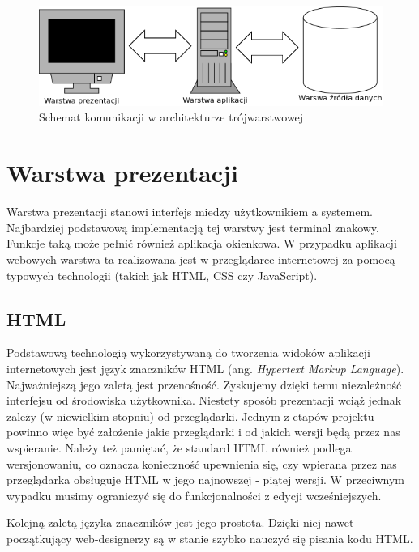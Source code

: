 \begin{figure}[tdh]
    \begin{center}
	\includegraphics[scale=.7 ]{img/warstwy.png}
	\caption{Schemat komunikacji w architekturze trójwarstwowej}
	\label{warstwy}
    \end{center}
\end{figure}


\section[Warstwa prezentacji][Warstwa prezentacji]{Warstwa prezentacji}
Warstwa prezentacji stanowi interfejs miedzy użytkownikiem a systemem. Najbardziej podstawową implementacją tej warstwy jest terminal znakowy. Funkcje taką może pełnić również aplikacja okienkowa. W przypadku aplikacji webowych warstwa ta realizowana jest w przeglądarce internetowej za pomocą typowych technologii (takich jak HTML, CSS czy JavaScript).

\subsection[HTML][HTML]{HTML}
Podstawową technologią wykorzystywaną do tworzenia widoków aplikacji internetowych jest język znaczników HTML (ang. \textit{Hypertext Markup Language}). Najważniejszą jego zaletą jest przenośność. Zyskujemy dzięki temu niezależność interfejsu od środowiska użytkownika. Niestety sposób prezentacji wciąż jednak zależy (w niewielkim stopniu) od przeglądarki. Jednym z etapów projektu powinno więc być założenie jakie przeglądarki i od jakich wersji będą przez nas wspieranie. Należy też pamiętać, że standard HTML również podlega wersjonowaniu, co oznacza konieczność upewnienia się, czy wpierana przez nas przeglądarka obsługuje HTML w jego najnowszej - piątej wersji. W przeciwnym wypadku musimy ograniczyć się do funkcjonalności z edycji wcześniejszych.

Kolejną zaletą języka znaczników jest jego prostota. Dzięki niej nawet początkujący web-designerzy są w stanie szybko nauczyć się pisania kodu HTML.

